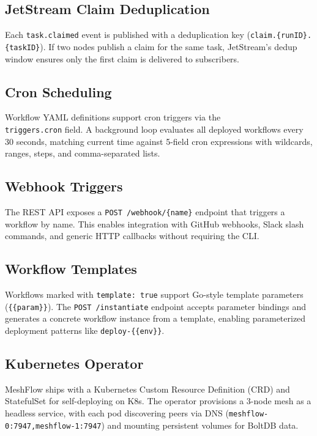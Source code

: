 \documentclass[sigconf]{acmart}
\begin{document}
\subsection{JetStream Claim Deduplication}

Each \mbox{\texttt{task.claimed}} event is published with a deduplication key (\mbox{\texttt{claim.\{runID\}.\{taskID\}}}). If two nodes publish a claim for the same task, JetStream's dedup window ensures only the first claim is delivered to subscribers.

\subsection{Cron Scheduling}

Workflow YAML definitions support cron triggers via the \\
\texttt{triggers.cron} field. A background loop evaluates all deployed workflows every 30 seconds, matching current time against 5-field cron expressions with wildcards, ranges, steps, and comma-separated lists.

\subsection{Webhook Triggers}

The REST API exposes a \texttt{POST /webhook/\{name\}} endpoint that triggers a workflow by name. This enables integration with GitHub webhooks, Slack slash commands, and generic HTTP callbacks without requiring the CLI.

\subsection{Workflow Templates}

Workflows marked with \texttt{template: true} support Go-style template parameters (\texttt{\{\{param\}\}}). The \texttt{POST /instantiate} endpoint accepts parameter bindings and generates a concrete workflow instance from a template, enabling parameterized deployment patterns like \texttt{deploy-\{\{env\}\}}.

\subsection{Kubernetes Operator}

MeshFlow ships with a Kubernetes Custom Resource Definition (CRD) and StatefulSet for self-deploying on K8s. The operator provisions a 3-node mesh as a headless service, with each pod discovering peers via DNS (\texttt{meshflow-0:7947,meshflow-1:7947}) and mounting persistent volumes for BoltDB data.
\end{document}
